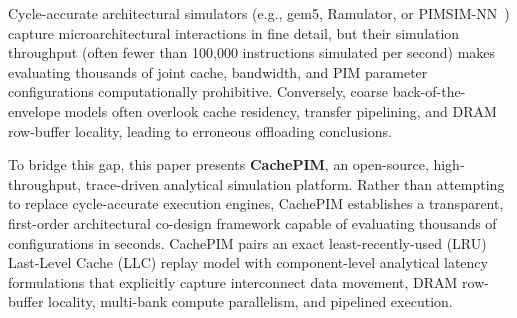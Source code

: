 \documentclass[journal,10pt,twocolumn]{IEEEtran}
\begin{document}
Cycle-accurate architectural simulators (e.g., gem5, Ramulator, or PIMSIM-NN~\cite{Wang2024}) capture microarchitectural interactions in fine detail, but their simulation throughput (often fewer than 100,000 instructions simulated per second) makes evaluating thousands of joint cache, bandwidth, and PIM parameter configurations computationally prohibitive. Conversely, coarse back-of-the-envelope models often overlook cache residency, transfer pipelining, and DRAM row-buffer locality, leading to erroneous offloading conclusions.

To bridge this gap, this paper presents \textbf{CachePIM}, an open-source, high-throughput, trace-driven analytical simulation platform. Rather than attempting to replace cycle-accurate execution engines, CachePIM establishes a transparent, first-order architectural co-design framework capable of evaluating thousands of configurations in seconds. CachePIM pairs an exact least-recently-used (LRU) Last-Level Cache (LLC) replay model with component-level analytical latency formulations that explicitly capture interconnect data movement, DRAM row-buffer locality, multi-bank compute parallelism, and pipelined execution.
\end{document}
